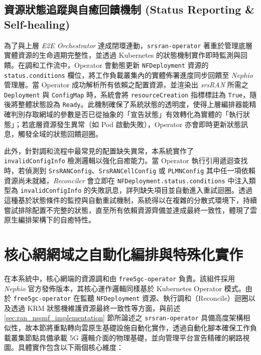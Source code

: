 \subsection{資源狀態追蹤與自癒回饋機制 (Status Reporting \& Self-healing)}
\label{subsec:ran_status_reporting}

為了與上層 \textit{E2E Orchestrator} 達成閉環連動，\texttt{srsran-operator} 著重於管理底層實體資源的生命週期完整性，並透過 Kubernetes 的狀態機制實作即時監測與回饋。在調和工作流中，Operator 會動態更新 \texttt{NFDeployment} 資源的 \texttt{status.conditions} 欄位，將工作負載叢集內的實體佈署進度同步回饋至 \textit{Nephio} 管理層。當 Operator 成功解析所有依賴之配置資源，並渲染出 \textit{srsRAN} 所需之 \texttt{Deployment} 與 \texttt{ConfigMap} 時，系統會將 \texttt{resourceCreation} 指標標註為 \texttt{True}，隨後將整體狀態設為 \texttt{Ready}。此機制確保了系統狀態的透明度，使得上層編排器能精確判別存取網域的參數是否已從抽象的「宣告狀態」有效轉化為實體的「執行狀態」；若底層資源發生異常（如 Pod 啟動失敗），Operator 亦會即時更新狀態訊息，觸發全域的狀態回饋迴圈。

此外，針對調和流程中最常見的配置缺失異常，本系統實作了 \texttt{invalidConfigInfo} 檢測邏輯以強化自癒能力。當 Operator 執行引用遞迴查找時，若偵測到 \texttt{SrsRANConfig}、\texttt{SrsRANCellConfig} 或 \texttt{PLMNConfig} 其中任一項依賴資源尚未就緒，\textit{Reconciler} 會立即在 \texttt{NFDeployment.status.conditions} 中注入類型為 \texttt{invalidConfigInfo} 的失敗訊息，詳列缺失項目並自動進入重試迴圈。透過這種基於狀態條件的監控與自動重試機制，系統得以在複雜的分散式環境下，持續嘗試排除配置不完整的狀態，直至所有依賴資源齊備並達成最終一致性，體現了雲原生編排架構下的自癒特性。

\section{核心網網域之自動化編排與特殊化實作}
\label{sec:core_domain_orchestration}

在本系統中，核心網端的資源調和由 \texttt{free5gc-operator} 負責。該組件採用 \textit{Nephio} 官方發佈版本，其核心運作邏輯同樣基於 Kubernetes Operator 模式。由於 \texttt{free5gc-operator} 在監聽 \texttt{NFDeployment} 資源、執行調和（Reconcile）迴圈以及透過 KRM 狀態機維護資源最終一致性等方面，與前述 \ref{sec:ran_nssmf_implementation} 節所論述之 \texttt{srsran-operator} 具備高度架構相似性，故本節將重點轉向雲原生基礎設施自動化實作，透過自動化腳本確保工作負載叢集節點具備承載 5G 邏輯介面的物理基礎，並向管理平台宣告精確的網路視圖。具體實作包含以下兩個核心維度：

